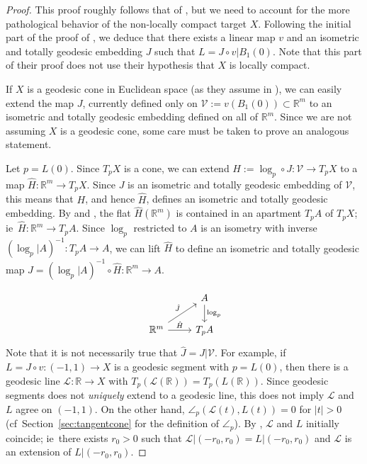 \documentclass[12pt]{amsart}
\theoremstyle{definition}
\numberwithin{equation}{section}
\newcommand{\R}{\mathbb R}
\begin{document}
\begin{proof}This proof roughly follows that of \cite[Theorem 3.1]{gromov-schoen}, but we need to account for the more pathological behavior of the non-locally compact target $X$.
Following the initial part of the proof of \cite[Theorem 3.1]{gromov-schoen}, we  deduce that there exists a linear map $v$ and an isometric and  totally geodesic embedding $J$ such that $L= J \circ v|B_1(0)$.  Note that this part of  their proof does not use their hypothesis that $X$ is locally compact.

If $X$ is a geodesic cone in Euclidean space (as they assume in  \cite[Theorem 3.1]{gromov-schoen}),  we can easily  extend the map $J$, currently defined only on $\mathscr V:=v(B_1(0)) \subset \R^m$ 
  to an isometric and totally geodesic embedding  defined on all of $\R^m$.  Since we are not assuming $X$ is a geodesic cone, some care must be taken to prove an analogous statement.  
  
  Let $p=L(0)$.    Since $T_{p}X$ is a cone, we can   extend $H:=\log_{p} \circ J:\mathscr V \rightarrow T_{p}X$ 
  to a map $\hat H:\R^m \rightarrow T_{p}X$.  Since $J$ is an isometric and totally geodesic  embedding of 
 $\mathscr V$,
  this means that 
  $H$, and hence  $\hat H$, defines an isometric and  totally geodesic embedding.  By \cite[Proposition 4.6.1]{kleiner-leeb} and \cite[Lemma 4.2.3]{kleiner-leeb}, the flat  $\hat H(\R^m)$ is contained in an apartment $T_{p}A$ of $T_{p}X$; ie~$\hat H:\R^m \to T_{p}A$.
Since $\log_{p}$ restricted to $A$ is an isometry with inverse $(\log_p|A)^{-1}:T_pA \to A$, we can lift $\hat H$ to define an isometric and totally geodesic map $\hat J=(\log_{p}|A)^{-1} \circ  \hat H:\R^m \to A$.  

\begin{equation*}
\begin{tikzcd}
    &  A \arrow[d, "\log_{p}" ] \\
  \R^m  \arrow[ur, "\hat J"] \arrow[r, "\hat H" ]
& T_{p}A \end{tikzcd}
\end{equation*}
Note that it is not necessarily true that $\hat J=J|\mathscr V$.
For example, if $L=J\circ v:(-1,1) \to X$ is a geodesic segment with $p=L(0)$, then there is a geodesic line $\mathscr L:\R \to X$  with $T_p(\mathscr L(\R)) = T_p(L(\R))$.  Since geodesic segments does not {\it uniquely} extend to a geodesic line, this does not imply $\mathscr L$ and $L$ agree on $(-1,1)$.  On the other hand,  $\angle_p(\mathscr L(t), L(t))=0$ for $|t| >0$ (cf~Section~\ref{sec:tangentcone} for the definition of $\angle_p$). By \cite[Lemma 4.1.2]{kleiner-leeb}, $\mathscr L$ and $L$ initially coincide; ie~there exists  $r_0>0$ such that $\mathscr L|(-r_0,r_0)= L|(-r_0,r_0)$ and $\mathscr L$ is an extension of $L|(-r_0,r_0)$.


\end{proof}
\end{document}

